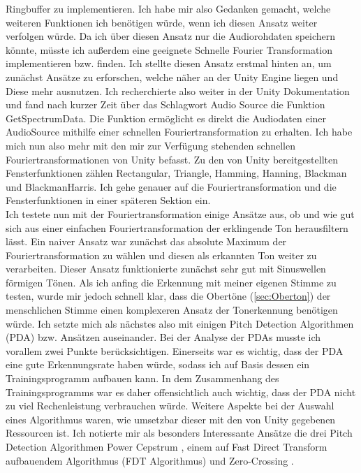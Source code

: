 Ringbuffer zu implementieren. Ich habe mir also Gedanken gemacht, welche weiteren Funktionen ich benötigen würde, wenn ich diesen Ansatz weiter verfolgen würde. Da ich über diesen Ansatz nur die Audiorohdaten 
speichern könnte, müsste ich außerdem eine geeignete Schnelle Fourier Transformation implementieren bzw. finden. Ich stellte diesen Ansatz erstmal hinten an, um zunächst Ansätze zu erforschen, welche näher 
an der Unity Engine liegen und Diese mehr ausnutzen. Ich recherchierte also weiter in der Unity Dokumentation und fand nach kurzer Zeit über das Schlagwort Audio Source die Funktion GetSpectrumData. Die Funktion ermöglicht es
direkt die Audiodaten einer AudioSource mithilfe einer schnellen Fouriertransformation zu erhalten. Ich habe mich nun also mehr mit den mir zur Verfügung stehenden schnellen Fouriertransformationen von Unity befasst.
Zu den von Unity bereitgestellten Fensterfunktionen zählen Rectangular, Triangle, Hamming, Hanning, Blackman und BlackmanHarris. Ich gehe genauer auf die Fouriertransformation und die Fensterfunktionen in einer späteren Sektion ein. \\
Ich testete nun mit der Fouriertransformation einige Ansätze aus, ob und wie gut sich aus einer einfachen Fouriertransformation der erklingende Ton herausfiltern lässt. Ein naiver Ansatz war zunächst das absolute Maximum der Fouriertransformation zu wählen und diesen als erkannten Ton weiter zu verarbeiten. Dieser Ansatz 
funktionierte zunächst sehr gut mit Sinuswellen förmigen Tönen. Als ich anfing die Erkennung mit meiner eigenen Stimme zu testen, wurde mir jedoch schnell klar, dass die Obertöne (\ref{sec:Oberton}) der menschlichen Stimme einen 
komplexeren Ansatz der Tonerkennung benötigen würde. Ich setzte mich als nächstes also mit einigen Pitch Detection Algorithmen (PDA) bzw. Ansätzen auseinander. Bei der Analyse der PDAs musste ich vorallem zwei Punkte berücksichtigen. Einerseits war es wichtig, dass der PDA eine gute Erkennungsrate haben würde, sodass ich auf Basis dessen ein 
Trainingsprogramm aufbauen kann. In dem Zusammenhang des Trainingsprogramms war es daher offensichtlich auch wichtig, dass der PDA nicht zu viel Rechenleistung verbrauchen würde. Weitere Aspekte bei der Auswahl eines Algorithmus waren, wie umsetzbar dieser mit den von Unity gegebenen Ressourcen ist. 
Ich notierte mir als besonders Interessante Ansätze die drei Pitch Detection Algorithmen Power Cepstrum \cite{norton2003fundamentals}, einem auf Fast Direct Transform aufbauendem Algorithmus (FDT Algorithmus) \cite{yazama2005simple} und Zero-Crossing \cite{amado2008pitch}.

